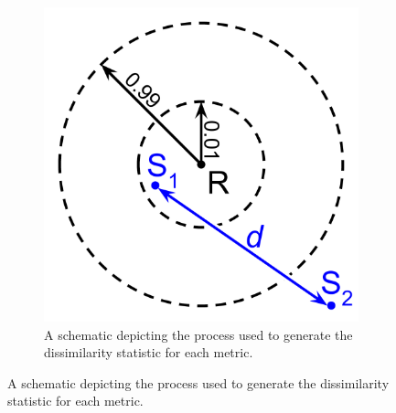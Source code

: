 \begin{figure}

\begin{center}
\begin{subfigure}[b]{\linewidth}
\begin{minipage}{0.5\linewidth}

\includegraphics[width=0.75\linewidth]{img/elasticity-statistic}

\end{minipage}
\begin{minipage}{0.5\linewidth}
\caption{
A schematic depicting the process used to generate the dissimilarity statistic for each metric.
}
\label{fig:dissimilarity_statistic}
\end{minipage}

\end{subfigure}


\end{center}
\end{figure}
